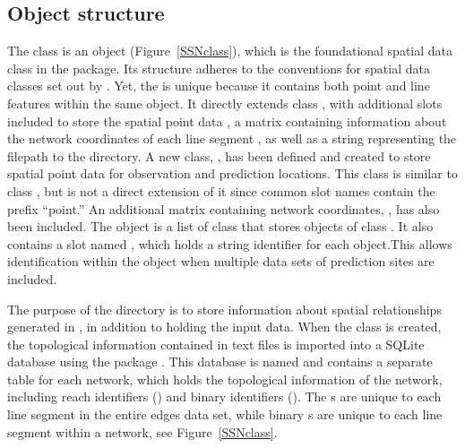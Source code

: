 \documentclass[nojss]{jss}
\begin{document}
\subsection{Object structure}

The  class is an  object
(Figure~\ref{SSNclass}), which is the foundational spatial data class
in the  package. Its structure adheres to the conventions for
spatial data classes set out by
\citet{Biva:Pebe:Gome:appl:2008}. Yet, the
 is unique because it contains both point
and line features within the same  object. It directly
extends class , with additional slots
included to store the spatial point data , a matrix
containing information about the network coordinates of each line
segment , as well as a string representing
the filepath to the  directory. A new class,
, has been defined and created to store spatial point
data for observation and prediction locations. This class is similar
to class , but is not a direct extension
of it since common slot names contain the prefix ``point.'' An
additional matrix containing network coordinates,
, has also been included. The object
 is a list of class  that stores
objects of class . It also contains a slot named
, which holds a string identifier for each 
object.This allows identification within the
 object when multiple data sets of
prediction sites are included.

The purpose of the  directory is to store information about
spatial relationships generated in , in addition to
holding the input data. When the  class is
created, the topological information contained in text files is
imported into a SQLite database using the  package
\citep{Jame:appl:2011}. This database is named  and
contains a separate table for each network, which holds the
topological information of the network, including reach identifiers
() and binary identifiers (). The s are
unique to each line segment in the entire edges data set, while binary
s are unique to each line segment within a network, see
Figure~\ref{SSNclass}.
\end{document}
